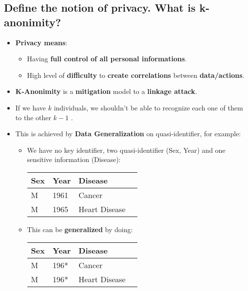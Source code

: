 \documentclass[9pt, letterpaper]{article}
\begin{document}
\subsection{Define the notion of privacy. What is k-anonimity?}
\begin{itemize}
	\item \textbf{Privacy means}:
	      \begin{itemize}
		      \item Having \textbf{full control of all personal informations}.
		      \item High level of \textbf{difficulty} to \textbf{create correlations} between \textbf{data/actions}.
	      \end{itemize}
	\item \textbf{K-Anonimity} is a \textbf{mitigation} model to a \textbf{linkage attack}.
	\item If we have $k$ individuals, we shouldn't be able to recognize each one of them to the other $k-1$ .
	\item This is achieved by \textbf{Data Generalization} on quasi-identifier, for example:
	      \begin{itemize}
		      \item We have no key identifier, two quasi-identifier (Sex, Year) and one sensitive information (Disease):
		            \begin{center}
			            \begin{tabular}{| C{1cm} | C{5cm} | C{5cm} | C{5cm} |}
				            \hline
				            \textbf{Sex} & \textbf{Year} & \textbf{Disease} \\  \hline
				            M            & 1961          & Cancer           \\
				            M            & 1965          & Heart Disease    \\
				            \hline
			            \end{tabular}
		            \end{center}
		      \item This can be \textbf{generalized} by doing:
		            \begin{center}
			            \begin{tabular}{| C{1cm} | C{5cm} | C{5cm} | C{5cm} |}
				            \hline
				            \textbf{Sex} & \textbf{Year} & \textbf{Disease} \\  \hline
				            M            & 196*          & Cancer           \\
				            M            & 196*          & Heart Disease    \\

\end{tabular}
\end{center}
\end{itemize}
\end{itemize}
\end{document}
